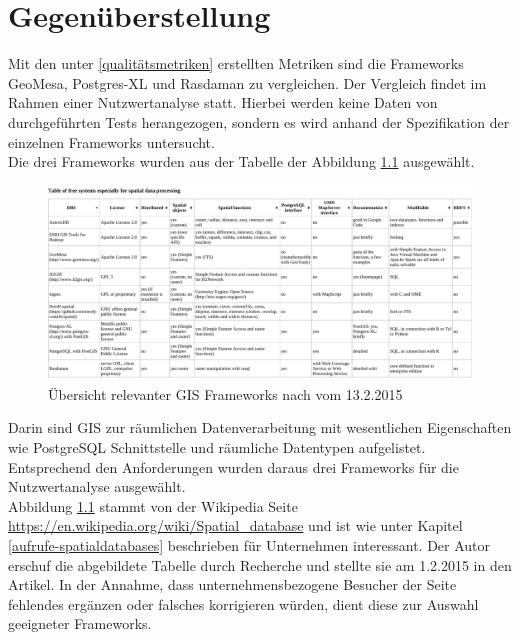\chapter{Gegenüberstellung}
Mit den unter \ref{qualitätsmetriken} erstellten Metriken sind die Frameworks GeoMesa, Postgres-XL und Rasdaman zu vergleichen.
Der Vergleich findet im Rahmen einer Nutzwertanalyse statt.
Hierbei werden keine Daten von durchgeführten Tests herangezogen, sondern es wird anhand der Spezifikation der einzelnen Frameworks untersucht.\\
%
Die drei Frameworks wurden aus der Tabelle der Abbildung \ref{fig:spatialdatabases} ausgewählt.
\begin{figure}
\centering
\includegraphics[width=\textwidth]{Abbildungen/table_spatialdatabases_13_2_15.pdf}
\caption[Übersicht relevanter GIS Frameworks]{Übersicht relevanter GIS Frameworks nach \cite{website:wiki-spatialdatabase} vom 13.2.2015}
\label{fig:spatialdatabases}
\end{figure}
Darin sind GIS zur räumlichen Datenverarbeitung mit wesentlichen Eigenschaften wie \mbox{PostgreSQL} Schnittstelle und räumliche Datentypen aufgelistet.
Entsprechend den Anforderungen wurden daraus drei Frameworks für die Nutzwertanalyse ausgewählt.\\
Abbildung \ref{fig:spatialdatabases} stammt von der Wikipedia Seite \url{https://en.wikipedia.org/wiki/Spatial_database} und ist wie unter Kapitel \ref{aufrufe-spatialdatabases} beschrieben für Unternehmen interessant.
Der Autor erschuf die abgebildete Tabelle durch Recherche und stellte sie am 1.2.2015 in den Artikel.
In der Annahme, dass unternehmensbezogene Besucher der Seite fehlendes ergänzen oder falsches korrigieren würden, dient diese zur Auswahl geeigneter Frameworks.


